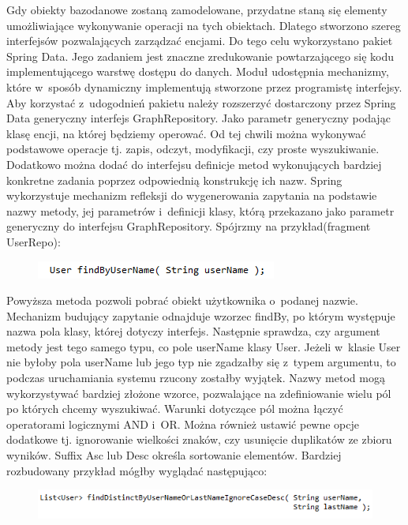 Gdy obiekty bazodanowe zostaną zamodelowane, przydatne staną się elementy umożliwiające wykonywanie operacji na tych obiektach. Dlatego stworzono szereg interfejsów pozwalających zarządzać encjami. Do tego celu wykorzystano pakiet Spring Data. Jego zadaniem jest znaczne zredukowanie powtarzającego się kodu implementującego warstwę dostępu do danych. Moduł udostępnia mechanizmy, które w~sposób dynamiczny implementują stworzone przez programistę interfejsy. Aby korzystać z~udogodnień pakietu należy rozszerzyć dostarczony przez Spring Data generyczny interfejs GraphRepository. Jako parametr generyczny podając klasę encji, na której będziemy operować. Od tej chwili można wykonywać podstawowe operacje tj. zapis, odczyt, modyfikacji, czy proste wyszukiwanie. Dodatkowo można dodać do interfejsu definicje metod wykonujących bardziej konkretne zadania poprzez odpowiednią konstrukcję ich nazw. Spring wykorzystuje mechanizm refleksji do wygenerowania zapytania na podstawie nazwy metody, jej parametrów i~definicji klasy, którą przekazano jako parametr generyczny do interfejsu GraphRepository. Spójrzmy na przykład(fragment UserRepo)\cite{repoWww}:

\begin{figure}[H]
	\centering
	\includegraphics{images/findbyusername.png}
\end{figure}


Powyższa metoda pozwoli pobrać obiekt użytkownika o~podanej nazwie. Mechanizm budujący zapytanie odnajduje wzorzec findBy, po którym występuje nazwa pola klasy, której dotyczy interfejs. Następnie sprawdza, czy argument metody jest tego samego typu, co pole userName klasy User. Jeżeli w~klasie User nie byłoby pola userName lub jego typ nie zgadzałby się z~typem argumentu, to podczas uruchamiania systemu rzucony zostałby wyjątek. 
Nazwy metod mogą wykorzystywać bardziej złożone wzorce, pozwalające na zdefiniowanie wielu pól po których chcemy wyszukiwać. Warunki dotyczące pól można łączyć operatorami logicznymi AND i~OR.  Można również ustawić pewne opcje dodatkowe tj. ignorowanie wielkości znaków, czy usunięcie duplikatów ze zbioru wyników. Suffix Asc lub Desc określa sortowanie elementów. Bardziej rozbudowany przykład mógłby wyglądać następująco:

\begin{figure}[H]
	\centering
	\includegraphics{images/findlong.png}
\end{figure}


